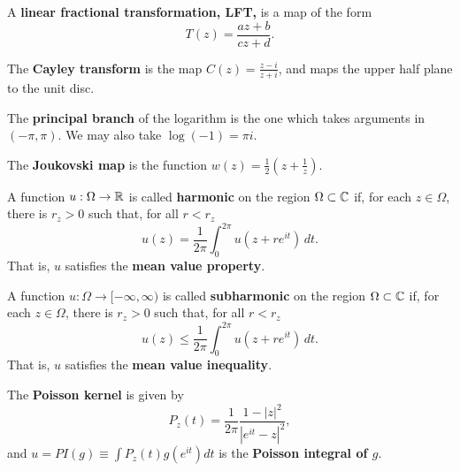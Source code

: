 \documentclass[12pt]{article}
\begin{document}
\begin{definition}
    A \textbf{linear fractional transformation, LFT,} is a map of the form
    \begin{equation*}
        T(z)=\frac{az+b}{cz+d}.
    \end{equation*}
\end{definition}

\begin{definition}
    The \textbf{Cayley transform} is the map $C(z)=\frac{z-i}{z+i}$, and maps the upper half plane to the unit disc.
\end{definition}

\begin{definition}
    The \textbf{principal branch} of the logarithm is the one which takes arguments in $(-\pi,\pi)$. We may also take $\log(-1)=\pi i$.
\end{definition}
\begin{definition}
    The \textbf{Joukovski map} is the function $w(z)=\frac{1}{2}\left(z+\frac{1}{z}\right)$.
\end{definition}

\newpage
\begin{definition}
    A function $u:\Omega\to\mathbb{R}$ is called \textbf{harmonic} on the region $\Omega\subset\mathbb{C}$ if, for each $z\in\Omega$, there is $r_z>0$ such that, for all $r<r_z$
    \begin{equation*}
        u(z)=\frac{1}{2\pi}\int_0^{2\pi}u(z+re^{it})\,dt.
    \end{equation*}
    That is, $u$ satisfies the \textbf{mean value property}.
\end{definition}

\begin{definition}
    A function $u:\Omega\to[-\infty,\infty)$ is called \textbf{subharmonic} on the region $\Omega\subset\mathbb{C}$ if, for each $z\in\Omega$, there is $r_z>0$ such that, for all $r<r_z$
    \begin{equation*}
        u(z)\leq\frac{1}{2\pi}\int_0^{2\pi}u(z+re^{it})\,dt.
    \end{equation*}
    That is, $u$ satisfies the \textbf{mean value inequality}.
\end{definition}

\begin{definition}
    The \textbf{Poisson kernel} is given by
    \begin{equation*}
        P_z(t)=\frac{1}{2\pi}\frac{1-|z|^2}{|e^{it}-z|^2},
    \end{equation*}
    and $u=PI(g)\equiv \int P_z(t)g(e^{it})dt$ is the \textbf{Poisson integral of $g$}.
\end{definition}
\end{document}
